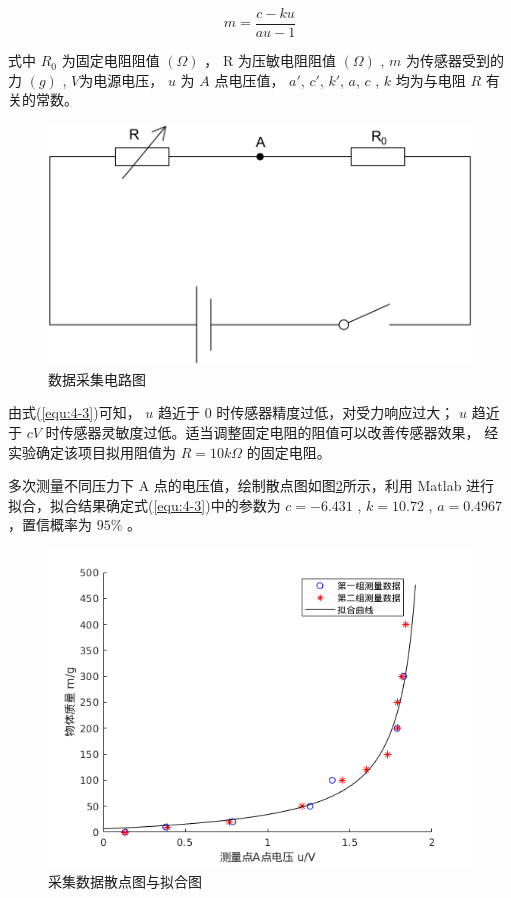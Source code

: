 \begin{equation}
  \label{equ:4-3}
  m = \frac{{c - ku}}{{au - 1}}
\end{equation}

式中 $R_0$ 为固定电阻阻值 $(\Omega )$ ， R 为压敏电阻阻值 $(\Omega )$ ,
$m$ 为传感器受到的力 $(g)$ , $V$为电源电压， $u$ 为 $A$ 点电压值，
$a'$, $c'$, $k'$, $a$, $c$ , $k$ 均为与电阻 $R$ 有关的常数。

\begin{figure}[!ht]
  \centering
  \includegraphics[scale=0.4]{chapter04/pic/4-3}
  \caption{数据采集电路图}
  \label{fig:4-3}
  \vspace{-0.3cm}
\end{figure}

由式(\ref{equ:4-3})可知， $u$ 趋近于 0 时传感器精度过低，对受力响应过大；
$u$ 趋近于 $cV$ 时传感器灵敏度过低。适当调整固定电阻的阻值可以改善传感器效果，
经实验确定该项目拟用阻值为 $R=10k\Omega$ 的固定电阻。

多次测量不同压力下 A 点的电压值，绘制散点图如图\ref{fig:4-4}所示，利用 Matlab 进行
拟合，拟合结果确定式(\ref{equ:4-3})中的参数为
$c = − 6.431$ , $ k = 10.72 $ , $a = 0.4967$ ，置信概率为 $95\%$ 。

\begin{figure}[!ht]
  \centering
  \includegraphics[width=13.5cm]{chapter04/pic/4-4}
  \caption{采集数据散点图与拟合图}
  \label{fig:4-4}
  \vspace{-0.3cm}
\end{figure}

